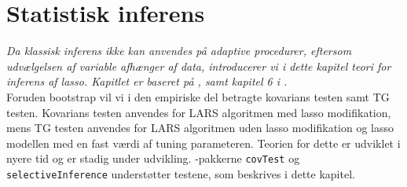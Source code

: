 \chapter{Statistisk inferens} \label{ch:statistisk_inferens}
\textit{Da klassisk inferens ikke kan anvendes på adaptive procedurer, eftersom udvælgelsen af variable afhænger af data, introducerer vi i dette kapitel teori for inferens af lasso. Kapitlet er baseret på \citep{lockhart}, \citep{post_inference} samt kapitel 6 i \citep{hastie}.} \\[4mm]
%
Foruden bootstrap vil vi i den empiriske del betragte kovarians testen samt TG testen.
Kovarians testen anvendes for LARS algoritmen med lasso modifikation, mens TG testen anvendes for LARS algoritmen uden lasso modifikation og lasso modellen med en fast værdi af tuning parameteren.
Teorien for dette er udviklet i nyere tid og er stadig under udvikling.
\Rlang-pakkerne \texttt{covTest} og \texttt{selectiveInference} understøtter testene, som beskrives i dette kapitel.







